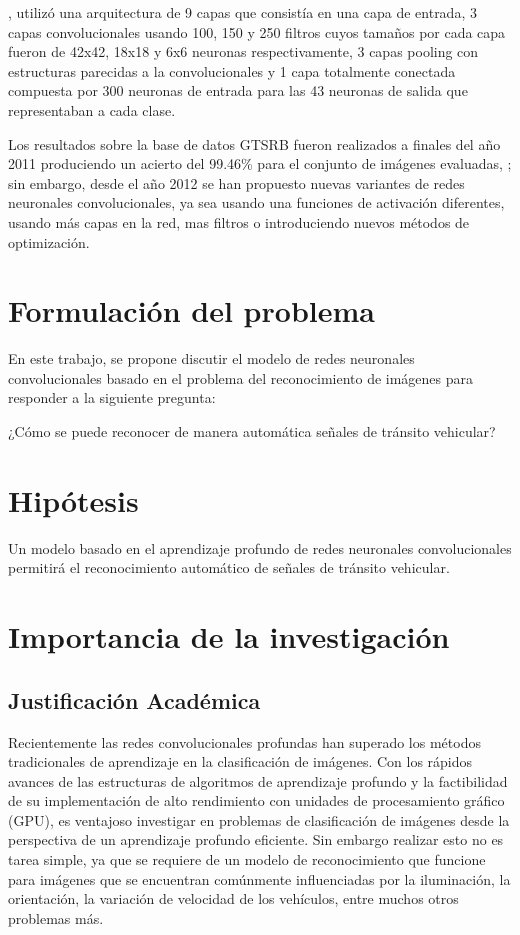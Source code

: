 		\citep{Ciresan}, utilizó una arquitectura de 9 capas que consistía en una capa de entrada, 3 capas convolucionales usando 100, 150 y 250 filtros cuyos tamaños por cada capa fueron de 42x42, 18x18 y 6x6 neuronas respectivamente, 3 capas pooling con estructuras parecidas a la convolucionales y 1 capa totalmente conectada compuesta por 300 neuronas de entrada para las 43 neuronas de salida que representaban a cada clase.
		\vskip 0.4cm

		Los resultados sobre la base de datos GTSRB fueron realizados a finales del año 2011 produciendo un acierto del 99.46\% para el conjunto de imágenes evaluadas, \citep{Stallkamp2012}; sin embargo, desde el año 2012 se han propuesto nuevas variantes de redes neuronales convolucionales, ya sea usando una funciones de activación diferentes, usando más capas en la red, mas filtros o introduciendo nuevos métodos de optimización.


\section{Formulación del problema}

  En este trabajo, se propone discutir el modelo de redes neuronales convolucionales basado en el problema del reconocimiento de imágenes para responder a la siguiente pregunta:
 \begin{center} 
     ¿Cómo se puede reconocer de manera automática señales de tránsito vehicular?
 \end{center}

\section{Hipótesis}
	 Un modelo basado en el aprendizaje profundo de redes neuronales convolucionales permitirá el reconocimiento automático de señales de tránsito vehicular.

\section{Importancia de la investigación} 

	\subsection{Justificación Académica}

	Recientemente las redes convolucionales profundas han superado los métodos tradicionales de aprendizaje en la clasificación de imágenes. Con los rápidos avances de las estructuras de algoritmos de aprendizaje profundo y la factibilidad de su implementación de alto rendimiento con unidades de procesamiento gráfico (GPU), es ventajoso investigar en problemas de clasificación de imágenes desde la perspectiva de un aprendizaje profundo eficiente. Sin embargo realizar esto no es tarea simple, ya que se requiere de un modelo de reconocimiento que funcione para imágenes que se encuentran comúnmente influenciadas por la iluminación, la orientación, la variación de velocidad de los vehículos, entre muchos otros problemas más.  \vskip 0.2cm

